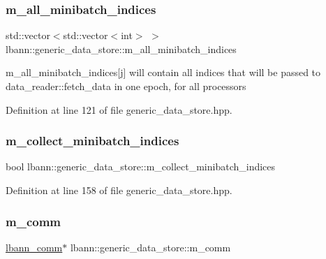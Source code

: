 \subsubsection{\texorpdfstring{m\+\_\+all\+\_\+minibatch\+\_\+indices}{m\_all\_minibatch\_indices}}
{\footnotesize\ttfamily std\+::vector$<$std\+::vector$<$int$>$ $>$ lbann\+::generic\+\_\+data\+\_\+store\+::m\+\_\+all\+\_\+minibatch\+\_\+indices\hspace{0.3cm}{\ttfamily [protected]}}

m\+\_\+all\+\_\+minibatch\+\_\+indices\mbox{[}j\mbox{]} will contain all indices that will be passed to data\+\_\+reader\+::fetch\+\_\+data in one epoch, for all processors 

Definition at line 121 of file generic\+\_\+data\+\_\+store.\+hpp.

\mbox{\label{classlbann_1_1generic__data__store_aa8ce7dae1eeb256820ac4f99893a6d32}} 
\subsubsection{\texorpdfstring{m\+\_\+collect\+\_\+minibatch\+\_\+indices}{m\_collect\_minibatch\_indices}}
{\footnotesize\ttfamily bool lbann\+::generic\+\_\+data\+\_\+store\+::m\+\_\+collect\+\_\+minibatch\+\_\+indices\hspace{0.3cm}{\ttfamily [protected]}}



Definition at line 158 of file generic\+\_\+data\+\_\+store.\+hpp.

\mbox{\label{classlbann_1_1generic__data__store_a719b6b99c20f97a6cf25f6029582bf36}} 
\subsubsection{\texorpdfstring{m\+\_\+comm}{m\_comm}}
{\footnotesize\ttfamily \hyperlink{classlbann_1_1lbann__comm}{lbann\+\_\+comm}$\ast$ lbann\+::generic\+\_\+data\+\_\+store\+::m\+\_\+comm\hspace{0.3cm}{\ttfamily [protected]}}



